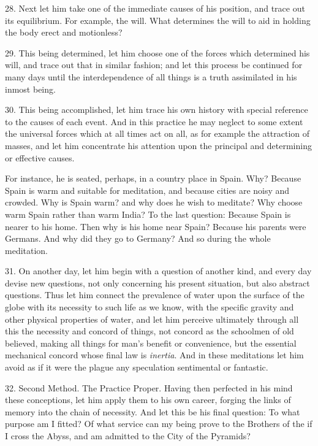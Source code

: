 28. Next let him take one of the immediate causes of his position, and trace out its equilibrium. For example, the will. What determines the will to aid in holding the body erect and motionless?

29. This being determined, let him choose one of the forces which determined his will, and trace out that in similar fashion; and let this process be continued for many days until the interdependence of all things is a truth assimilated in his inmost being.

30. This being accomplished, let him trace his own history with special reference to the causes of each event. And in this practice he may neglect to some extent the universal forces which at all times act on all, as for example the attraction of masses, and let him concentrate his attention upon the principal and determining or effective causes.

For instance, he is seated, perhaps, in a country place in Spain. Why? Because Spain is warm and suitable for meditation, and because cities are noisy and crowded. Why is Spain warm? and why does he wish to meditate? Why choose warm Spain rather than warm India? To the last question: Because Spain is nearer to his home. Then why is his home near Spain? Because his parents were Germans. And why did they go to Germany? And so during the whole meditation.

31. On another day, let him begin with a question of another kind, and every day devise new questions, not only concerning his present situation, but also abstract questions. Thus let him connect the prevalence of water upon the surface of the globe with its necessity to such life as we know, with the specific gravity and other physical properties of water, and let him perceive ultimately through all this the necessity and concord of things, not concord as the schoolmen of old believed, making all things for man’s benefit or convenience, but the essential mechanical concord whose final law is \textit{inertia}. And in these meditations let him avoid as if it were the plague any speculation sentimental or fantastic.

32. Second Method. The Practice Proper. Having then perfected in his mind these conceptions, let him apply them to his own career, forging the links of memory into the chain of necessity. And let this be his final question: To what purpose am I fitted? Of what service can my being prove to the Brothers of the \Argentium{}{} if I cross the Abyss, and am admitted to the City of the Pyramids?

